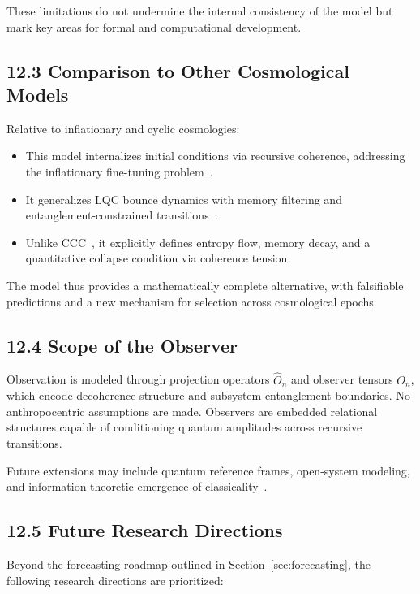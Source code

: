 These limitations do not undermine the internal consistency of the model but mark key areas for formal and computational development.

\subsection{12.3 Comparison to Other Cosmological Models}

Relative to inflationary and cyclic cosmologies:
\begin{itemize}
  \item This model internalizes initial conditions via recursive coherence, addressing the inflationary fine-tuning problem~\cite{guth1981inflationary}.
  \item It generalizes LQC bounce dynamics with memory filtering and entanglement-constrained transitions~\cite{ashtekar2006quantum}.
  \item Unlike CCC~\cite{penrose2010cycles}, it explicitly defines entropy flow, memory decay, and a quantitative collapse condition via coherence tension.
\end{itemize}

The model thus provides a mathematically complete alternative, with falsifiable predictions and a new mechanism for selection across cosmological epochs.

\subsection{12.4 Scope of the Observer}

Observation is modeled through projection operators \( \hat{O}_n \) and observer tensors \( O_n \), which encode decoherence structure and subsystem entanglement boundaries. No anthropocentric assumptions are made. Observers are embedded relational structures capable of conditioning quantum amplitudes across recursive transitions.

Future extensions may include quantum reference frames, open-system modeling, and information-theoretic emergence of classicality~\cite{zurek_environment-induced_2003, tegmark_consciousness_2015}.

\subsection{12.5 Future Research Directions}

Beyond the forecasting roadmap outlined in Section~\ref{sec:forecasting}, the following research directions are prioritized:

